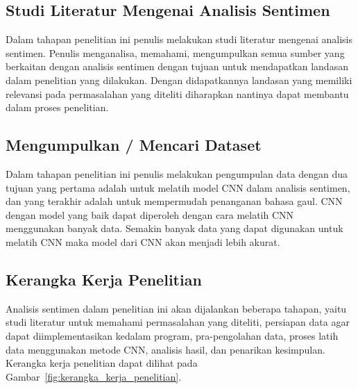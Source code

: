 \subsection{Studi Literatur Mengenai Analisis Sentimen}
Dalam tahapan penelitian ini penulis melakukan studi literatur mengenai analisis sentimen. Penulis
menganalisa, memahami, mengumpulkan semua sumber yang berkaitan dengan analisis sentimen dengan
tujuan untuk mendapatkan landasan dalam penelitian yang dilakukan. Dengan didapatkannya landasan yang
memiliki relevansi pada permasalahan yang diteliti diharapkan nantinya dapat membantu dalam proses
penelitian.

\subsection{Mengumpulkan / Mencari Dataset}
Dalam tahapan penelitian ini penulis melakukan pengumpulan data dengan dua tujuan yang pertama adalah
untuk melatih model CNN dalam analisis sentimen, dan yang terakhir adalah untuk mempermudah penanganan
bahasa gaul. CNN dengan model yang baik dapat diperoleh dengan cara melatih CNN menggunakan banyak
data. Semakin banyak data yang dapat digunakan untuk melatih CNN maka model dari CNN akan menjadi
lebih akurat.

\subsection{Kerangka Kerja Penelitian}
Analisis sentimen dalam penelitian ini akan dijalankan beberapa tahapan, yaitu studi literatur
untuk memahami permasalahan yang diteliti, persiapan data agar dapat diimplementasikan kedalam program,
pra-pengolahan data, proses latih data menggunakan metode CNN, analisis hasil, dan penarikan kesimpulan.
Kerangka kerja penelitian dapat dilihat pada Gambar~\ref{fig:kerangka_kerja_penelitian}.

